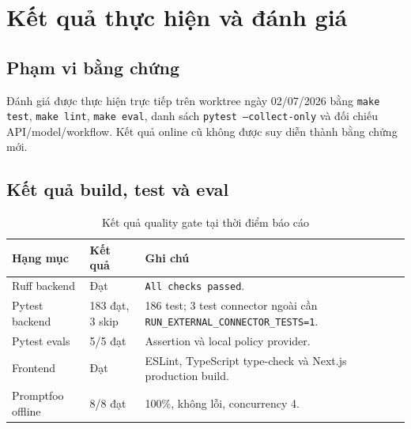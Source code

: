 \documentclass[12pt,a4paper]{article}
\begin{document}
\newpage
\section{Kết quả thực hiện và đánh giá}

\subsection{Phạm vi bằng chứng}
Đánh giá được thực hiện trực tiếp trên worktree ngày 02/07/2026 bằng \texttt{make test}, \texttt{make lint}, \texttt{make eval}, danh sách \texttt{pytest --collect-only} và đối chiếu API/model/workflow. Kết quả online cũ không được suy diễn thành bằng chứng mới.

\subsection{Kết quả build, test và eval}
\begin{table}[H]
\centering
\caption{Kết quả quality gate tại thời điểm báo cáo}
\label{tab:verification}
\begin{tabularx}{\textwidth}{p{}p{}X}
\toprule
\textbf{Hạng mục} & \textbf{Kết quả} & \textbf{Ghi chú} \\
\midrule
Ruff backend & Đạt & \texttt{All checks passed}. \\
Pytest backend & 183 đạt, 3 skip & 186 test; 3 test connector ngoài cần \texttt{RUN\_EXTERNAL\_CONNECTOR\_TESTS=1}. \\
Pytest evals & 5/5 đạt & Assertion và local policy provider. \\
Frontend & Đạt & ESLint, TypeScript type-check và Next.js production build. \\
Promptfoo offline & 8/8 đạt & 100\%, không lỗi, concurrency 4. \\
\bottomrule
\end{tabularx}
\end{table}
\end{document}
